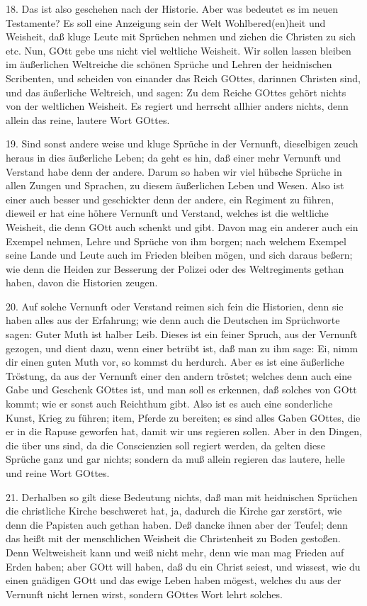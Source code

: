 18. Das ist also geschehen nach der Historie. Aber was bedeutet es im neuen Testamente? Es soll eine Anzeigung sein der Welt Wohlbered(en)heit und Weisheit, daß kluge Leute mit Sprüchen nehmen und ziehen die Christen zu sich etc. Nun, GOtt gebe uns nicht viel weltliche Weisheit. Wir sollen lassen bleiben im äußerlichen Weltreiche die schönen Sprüche und Lehren der heidnischen Scribenten, und scheiden von einander das Reich GOttes, darinnen Christen sind, und das äußerliche Weltreich, und sagen: Zu dem Reiche GOttes gehört nichts von der weltlichen Weisheit. Es regiert und herrscht allhier anders nichts, denn allein das reine, lautere Wort GOttes.

19. Sind sonst andere weise und kluge Sprüche in der Vernunft, dieselbigen zeuch heraus in dies äußerliche Leben; da geht es hin, daß einer mehr Vernunft und Verstand habe denn der andere. Darum so haben wir viel hübsche Sprüche in allen Zungen und Sprachen, zu diesem äußerlichen Leben und Wesen. Also ist einer auch besser und geschickter denn der andere, ein Regiment zu führen, dieweil er hat eine höhere Vernunft und Verstand, welches ist die weltliche Weisheit, die denn GOtt auch schenkt und gibt. Davon mag ein anderer auch ein Exempel nehmen, Lehre und Sprüche von ihm borgen; nach welchem Exempel seine Lande und Leute auch im Frieden bleiben mögen, und sich daraus beßern; wie denn die Heiden zur Besserung der Polizei oder des Weltregiments gethan haben, davon die Historien zeugen.

20. Auf solche Vernunft oder Verstand reimen sich fein die Historien, denn sie haben alles aus der Erfahrung; wie denn auch die Deutschen im Sprüchworte sagen: Guter Muth ist halber Leib. Dieses ist ein feiner Spruch, aus der Vernunft gezogen, und dient dazu, wenn einer betrübt ist, daß man zu ihm sage: Ei, nimm dir einen guten Muth vor, so kommst du herdurch. Aber es ist eine äußerliche Tröstung, da aus der Vernunft einer den andern tröstet; welches denn auch eine Gabe und Geschenk GOttes ist, und man soll es erkennen, daß solches von GOtt kommt; wie er sonst auch Reichthum gibt. Also ist es auch eine sonderliche Kunst, Krieg zu führen; item, Pferde zu bereiten; es sind alles Gaben GOttes, die er in die Rapuse geworfen hat, damit wir uns regieren sollen. Aber in den Dingen, die über uns sind, da die Conscienzien soll regiert werden, da gelten diese Sprüche ganz und gar nichts; sondern da muß allein regieren das lautere, helle und reine Wort GOttes.

21. Derhalben so gilt diese Bedeutung nichts, daß man mit heidnischen Sprüchen die christliche Kirche beschweret hat, ja, dadurch die Kirche gar zerstört, wie denn die Papisten auch gethan haben. Deß dancke ihnen aber der Teufel; denn das heißt mit der menschlichen Weisheit die Christenheit zu Boden gestoßen. Denn Weltweisheit kann und weiß nicht mehr, denn wie man mag Frieden auf Erden haben; aber GOtt will haben, daß du ein Christ seiest, und wissest, wie du einen gnädigen GOtt und das ewige Leben haben mögest, welches du aus der Vernunft nicht lernen wirst, sondern GOttes Wort lehrt solches.

